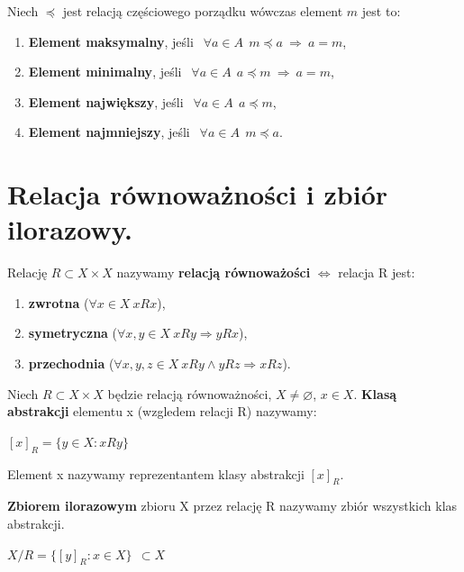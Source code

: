 \documentclass[12pt]{article}
\begin{document}
    \begin{definition}
        Niech $\preceq$ jest relacją częściowego porządku wówczas element $m$ jest to:
        \begin{enumerate}
            \item \textbf{Element maksymalny}, jeśli $~~ \forall a \in A ~~ m \preceq a ~ \Rightarrow  ~ a = m$,
            \item \textbf{Element minimalny}, jeśli $~~ \forall a \in A ~~ a \preceq m ~ \Rightarrow  ~ a = m$,
            \item \textbf{Element największy}, jeśli $~~ \forall a \in A ~~ a \preceq m$,
            \item \textbf{Element najmniejszy}, jeśli $~~ \forall a \in A ~~ m \preceq a$.
        \end{enumerate}
    \end{definition}

    \newpage

    \section{Relacja równoważności i zbiór ilorazowy.}

    \begin{definition}
        Relację $R \subset X \times X$ nazywamy \textbf{relacją równoważości} $\Leftrightarrow$ relacja R jest:
        \begin{enumerate}
            \item \textbf{zwrotna} ($\forall x \in X ~ xRx $),
            \item \textbf{symetryczna} ($\forall x,y \in X ~ xRy \Rightarrow yRx$),
            \item \textbf{przechodnia} ($\forall x,y,z \in X ~ xRy \wedge yRz \Rightarrow xRz$).
        \end{enumerate}
    \end{definition}

    \begin{definition}
        Niech $R \subset X \times X$ będzie relacją równoważności, $X \neq \varnothing$, $x \in X$. \textbf{Klasą abstrakcji}
        elementu x (wzgledem relacji R) nazywamy:

        $[x]_{R} = \{y \in X: xRy\}$

        Element x nazywamy reprezentantem klasy abstrakcji $[x]_{R}$.
    \end{definition}

    \begin{definition}
        \textbf{Zbiorem ilorazowym} zbioru X przez relację R nazywamy zbiór wszystkich klas abstrakcji.

        $X/R = \{[y]_{R}: x \in X\} ~~ \subset X$
    \end{definition}
\end{document}
